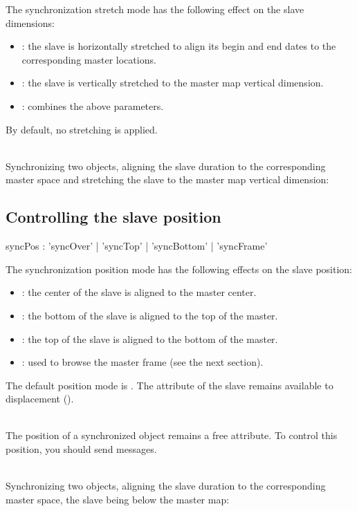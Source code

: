 \documentclass[a4paper,twoside]{report}
\newcommand{\subsublevel}[1]	{\subsection{#1}}
\begin{document}
The synchronization stretch mode has the following effect on the slave dimensions:
\begin{itemize}
\item {}: the slave is horizontally stretched to align its begin and end dates to the corresponding master locations.
\item {}: the slave is vertically stretched to the master map vertical dimension.
\item {}: combines the above parameters.
\end{itemize}
By default, no stretching is applied.

\example \\
Synchronizing two objects, aligning the slave duration to the corresponding master space and stretching the slave to the master map vertical dimension:


\subsublevel{Controlling the slave position}
\label{syncPos}


\begin{rail}
syncPos : 'syncOver' | 'syncTop' | 'syncBottom' | 'syncFrame'
\end{rail}

The synchronization position mode has the following effects on the slave  position:
\begin{itemize}
\item {}: the center of the slave is aligned to the master center.
\item {}: the bottom of the slave is aligned to the top of the master.
\item {}: the top of the slave is aligned to the bottom of the master.
\item {}: used to browse the master frame (see the next section).
\end{itemize}
The default position mode is . The  attribute of the slave remains available to displacement (). 

\note{} \\
The  position of a synchronized object remains a free attribute. To control this position, you should send  messages.  

\example \\
Synchronizing two objects, aligning the slave duration to the corresponding master space, the slave being below the master map:
\end{document}
